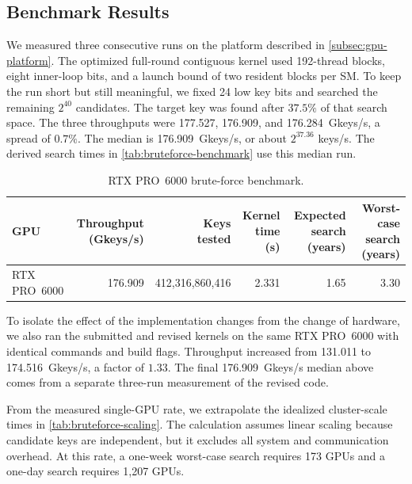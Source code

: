 \documentclass[version=preprint]{iacrcc}
\begin{document}
\subsection{Benchmark Results}\label{sec:bruteforce-experimental}

We measured three consecutive runs on the platform described in \autoref{subsec:gpu-platform}.
The optimized full-round contiguous kernel used 192-thread blocks, eight inner-loop bits, and a launch bound of two resident blocks per SM.
To keep the run short but still meaningful, we fixed 24 low key bits and searched the remaining $2^{40}$ candidates.
The target key was found after $37.5\%$ of that search space.
The three throughputs were 177.527, 176.909, and 176.284~Gkeys/s, a spread of $0.7\%$.
The median is 176.909~Gkeys/s, or about $2^{37.36}$ keys/s.
The derived search times in \autoref{tab:bruteforce-benchmark} use this median run.

\begin{table}[htbp]
  \centering
  \caption{RTX PRO~6000 brute-force benchmark.}
  \label{tab:bruteforce-benchmark}
  \footnotesize
  \setlength{\tabcolsep}{3pt}
  \renewcommand{\arraystretch}{1.05}
  \begin{tabular}{@{}lrrrrr@{}}
    \toprule
    GPU & \shortstack{Throughput\\(Gkeys/s)} & \shortstack{Keys\\tested} & \shortstack{Kernel\\time (s)} & \shortstack{Expected search\\(years)} & \shortstack{Worst-case search\\(years)} \\
    \midrule
    RTX PRO~6000 & 176.909 & 412,316,860,416 & 2.331 & 1.65 & 3.30 \\
    \bottomrule
  \end{tabular}
\end{table}

To isolate the effect of the implementation changes from the change of hardware, we also ran the submitted and revised kernels on the same RTX PRO~6000 with identical commands and build flags.
Throughput increased from 131.011 to 174.516~Gkeys/s, a factor of $1.33$.
The final 176.909~Gkeys/s median above comes from a separate three-run measurement of the revised code.

From the measured single-GPU rate, we extrapolate the idealized cluster-scale times in \autoref{tab:bruteforce-scaling}.
The calculation assumes linear scaling because candidate keys are independent, but it excludes all system and communication overhead.
At this rate, a one-week worst-case search requires 173 GPUs and a one-day search requires 1,207 GPUs.
\end{document}
